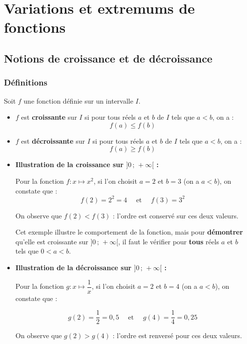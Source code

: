 \chapter{Variations et extremums de fonctions}

\section{Notions de croissance et de décroissance}

\subsection{Définitions}

\begin{defin}
	Soit $f$ une fonction définie sur un intervalle $I$.
	\begin{itemize}
		\item $f$ est \textbf{croissante} sur $I$ si pour tous réels $a$ et $b$ de $I$ tels que $a < b$, on a :
		      \[
			      f(a) \le f(b)
		      \]
		\item $f$ est \textbf{décroissante} sur $I$ si pour tous réels $a$ et $b$ de $I$ tels que $a < b$, on a :
		      \[
			      f(a) \ge f(b)
		      \]
	\end{itemize}
\end{defin}

\begin{ex}
	\nline
	\begin{itemize}
		\item \textbf{Illustration de la croissance sur $]0 \,;\, +\infty[$ :}

					      Pour la fonction $f: x \mapsto x^2$, si l'on choisit $a = 2$ et $b = 3$ (on a $a < b$), on constate que :
					      \[ f(2) = 2^2 =4\quad\text{ et }\quad f(3) = 3^2 \]

					      On observe que $f(2) < f(3)$ : l'ordre est conservé sur ces deux valeurs.

					      Cet exemple illustre le comportement de la fonction, mais pour \textbf{démontrer} qu'elle est croissante sur $]0 \,;\, +\infty[$, il faut le vérifier pour \textbf{tous} réels $a$ et $b$ tels que $0 < a < b$.

		\item \textbf{Illustration de la décroissance sur $]0 \,;\, +\infty[$ :}

		      Pour la fonction $g: x \mapsto \dfrac{1}{x}$, si l'on choisit $a = 2$ et $b = 4$ (on a $a < b$), on constate que :

		      \[
			      g(2) =\frac{1}{2}= 0{,}5\quad \text{ et }\quad g(4) = \frac{1}{4}=0{,}25
		      \]

		      On observe que $g(2) > g(4)$ : l'ordre est renversé pour ces deux valeurs.
	\end{itemize}
\end{ex}

